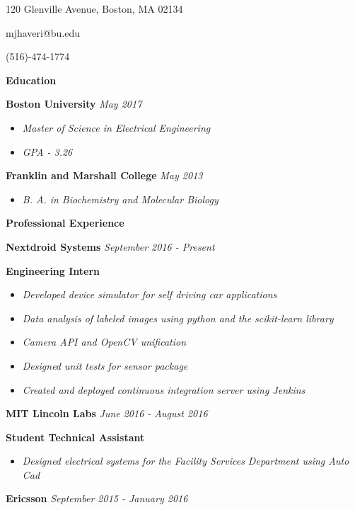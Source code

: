 \documentclass[8pt]{extarticle}
\begin{document}
\begin{center} 

120 Glenville Avenue, Boston, MA 02134

mjhaveri@bu.edu 

(516)-474-1774 
\end{center} 
\begin{changemargin}{-0.8cm}{0.0cm}
\textbf{Education}
\end{changemargin}
\vspace*{-0.4cm}
\makebox[\linewidth]{\rule{17cm}{0.4pt}}
\textbf{Boston University} \textit{May 2017}
\begin{itemize}
\item \textit{Master of Science in Electrical Engineering}
\item \textit{GPA - 3.26}
\end{itemize}
\textbf{Franklin and Marshall College} \textit{May 2013}
\begin{itemize}
\item \textit{B. A. in Biochemistry and Molecular Biology }

\end{itemize}

\begin{changemargin}{-0.8cm}{0.0cm}
\textbf{Professional Experience}
\end{changemargin}
\vspace*{-0.4cm}
\makebox[\linewidth]{\rule{17cm}{0.4pt}}
\textbf{Nextdroid Systems} \textit{September 2016 - Present}

\textbf{Engineering Intern} 
\begin{itemize}
\item \textit{Developed device simulator for self driving car applications}
\item \textit{Data analysis of labeled images using python and the scikit-learn library}
\item \textit{Camera API and OpenCV unification}
\item \textit{Designed unit tests for sensor package}
\item \textit{Created and deployed continuous integration server using Jenkins}
\end{itemize}
\textbf{MIT Lincoln Labs} \textit{June  2016 - August 2016}

\textbf{Student Technical Assistant } 
\begin{itemize}
\item \textit{Designed electrical systems for the Facility Services Department using Auto Cad}
\end{itemize}
\textbf{Ericsson} \textit{September  2015 - January 2016}
\end{document}
